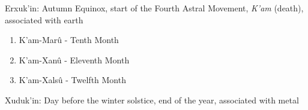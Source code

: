\documentclass[12pt]{article}
\begin{document}
Erxuk'in: Autumn Equinox, start of the Fourth Astral Movement, \textit{K'am} (death), associated with earth

\begin{enumerate}[resume]	
	
	\item K'am-Mar\^{u} - Tenth Month 

	\item K'am-Xan\^{u} - Eleventh Month
	
	\item K'am-Xals\^{u} - Twelfth Month
\end{enumerate}	


Xuduk'in: Day before the winter solstice, end of the year, associated with metal
	
\end{document}
